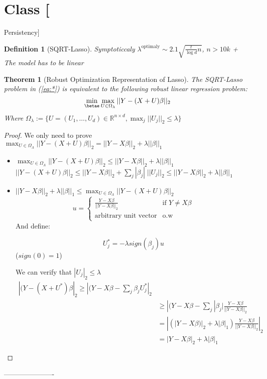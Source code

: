 \documentclass{article}
\newtheorem{theorem}{Theorem}
\newtheorem{definition}{Definition}
\newenvironment{class}[1]
{\section*{Class #1}}
{ ----------------------}
\begin{document}
\begin{class}{3}[Persistency]
\begin{definition}[SQRT-Lasso]
    Symptoticcaly $\lambda^{\text{optimaly}} \sim 2.1 \sqrt{\frac t{\log d}{n}}$, $n > 10k$ + The model has to be linear 
  \end{definition}
  \begin{theorem}[Robust Optimization Representation of Lasso]
    The SQRT-Lasso problem in (\ref{eq:*}) is equivalent to the following robust linear regression problem:
    $$\min_{\betae} \max_{U \in \Omega_{\lambda}} ||Y - (X + U)\beta||_2$$
    Where $\Omega_{\lambda} := \{ U = (U_1, \ldots, U_d)\in \mathbb R^{n \times d}, \max_j ||U_j||_2 \le \lambda \}$
  \end{theorem}
  \begin{proof}
    We only need to prove
    $\max_{U \in \Omega_{\Lambda}} ||Y - (X+U)\beta||_2 = ||Y - X\beta||_2 + \lambda ||\beta||_1$
    \begin{itemize}
    \item     $\max_{U \in \Omega_{\Lambda}} ||Y - (X+U)\beta||_2 \le ||Y - X\beta||_2 + \lambda ||\beta||_1$
      $||Y - (X+U)\beta||_2 \le ||Y - X\beta||_2 + \sum_j  |\beta_j| \; ||U_j||_2 \le ||Y - X\beta||_2 + \lambda ||\beta||_1$
    \item     $||Y - X\beta||_2 + \lambda ||\beta||_1 \le \max_{U \in \Omega_{\Lambda}} ||Y - (X+U)\beta||_2$
      \[
        u = \left\{
          \begin{array}{cc}
            \frac{Y - X\beta}{||Y-X\beta||_2} &\text{if } Y \ne X\beta\\
            \text{arbitrary unit vector}&\text{o.w}
          \end{array}
        \right.
      \]
      And define:
      
      $$U^*_j = -\lambda sign(\beta_j) u$$
      ($sign(0) = 1$)
      
      We can verify that $|U_j|_2 \le \lambda$
      \begin{align*}
        |(Y - (X+U^*)\beta|_2 \ge |(Y - X\beta - \sum_j \beta_jU^*_j|_2\\
        &\ge |(Y - X\beta - \sum_j |\beta_j| \frac{Y - X\beta}{||Y-X\beta||_2}\\
        &= | (|Y - X\beta)|_2 + \lambda |\beta|_1) \frac{Y - X\beta}{||Y-X\beta||_2} |_2\\
        &= |Y - X\beta|_2 + \lambda |\beta|_1
      \end{align*}


    \end{itemize}
    
  \end{proof}


\end{class}
\end{document}
